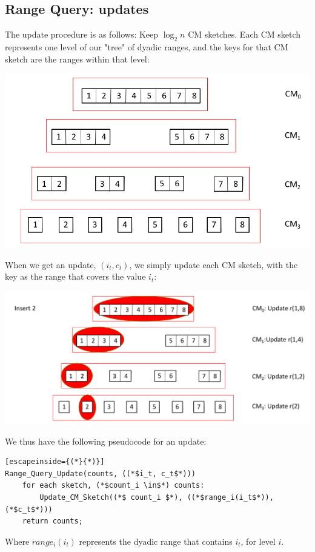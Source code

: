 \documentclass[11pt]{article}
\begin{document}
\subsection{Range Query: updates}
The update procedure is as follows: Keep $\log_2n$ CM sketches. Each CM sketch represents one level of our "tree" of dyadic ranges, and the keys for that CM sketch are the ranges within that level:
\begin{center}\includegraphics[scale=0.3]{dyadic_ranges_cm.png}\end{center}
When we get an update, $(i_t, c_t)$, we simply update each CM sketch, with the key as the range that covers the value $i_t$:
\begin{center}\includegraphics[scale=0.3]{range_update.png}\end{center}
We thus have the following pseudocode for an update:
\newpage
\begin{lstlisting}[escapeinside={(*}{*)}]
Range_Query_Update(counts, ((*$i_t, c_t$*)))
    for each sketch, (*$count_i \in$*) counts:
        Update_CM_Sketch((*$ count_i $*), ((*$range_i(i_t$*)), (*$c_t$*)))
    return counts;
\end{lstlisting}
Where $range_i(i_t)$ represents the dyadic range that contains $i_t$, for level $i$.
\end{document}
